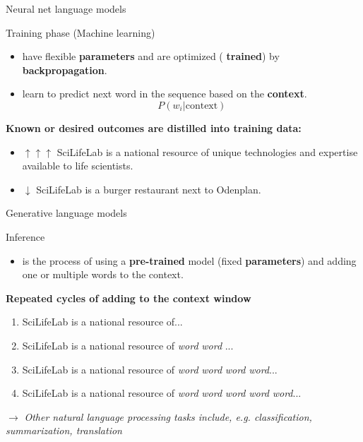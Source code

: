 \documentclass[10pt]{beamer}
\newcommand{\feature}[1]{{\color{scLime} \textbf{#1}}}
\newcommand{\remark}[1]{{\par \color{scGrape} \ensuremath{\rightarrow} \emph{#1}}}
\begin{document}
\begin{frame}{Neural net language models}
	\begin{exampleblock}{Training phase (Machine learning)}
		    \begin{itemize}
		    	\item have flexible \feature{parameters} and are optimized  (\feature{trained}) by \feature{backpropagation}.
	 \item learn to predict next word in the sequence based on the \feature{context}.
			$$
			P(w_{i}|{\mathrm  {context}})
			$$
			\end{itemize}
	\end{exampleblock}
		\textbf{Known or desired outcomes are distilled into training data:}
\begin{itemize}
	\item $\uparrow \uparrow \uparrow$ SciLifeLab is a national resource of unique technologies and expertise available to life scientists.
	\item $\downarrow$ SciLifeLab is a burger restaurant next to Odenplan.
\end{itemize}
\end{frame}


\begin{frame}{Generative language models}
	\begin{exampleblock}{Inference}
		\begin{itemize}
			\item is the process of using a \feature{pre-trained} model (fixed \feature{parameters}) and adding one or multiple words to the context.
		\end{itemize}
	\end{exampleblock}
	\textbf{Repeated cycles of adding to the \feature{context window}}
	\begin{enumerate}
		\item  SciLifeLab is a national resource of...
		\item SciLifeLab is a national resource of \emph{word} \emph{word} ...
		\item SciLifeLab is a national resource of \emph{word} \emph{word} \emph{word} \emph{word}...
		\item SciLifeLab is a national resource of \emph{word} \emph{word} \emph{word} \emph{word} \emph{word}...
	\end{enumerate}
	 \remark{Other natural language processing tasks include, e.g. classification, summarization, translation}
\end{frame}
\end{document}
